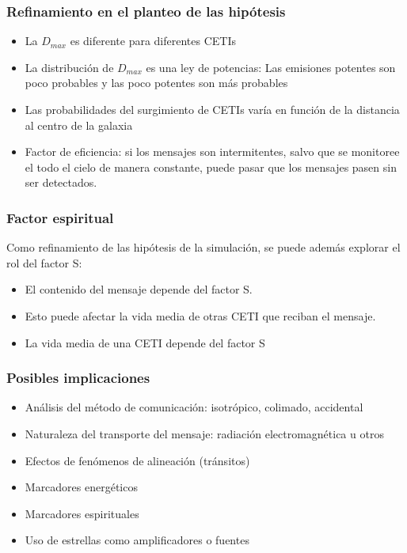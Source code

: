 \documentclass[handout]{beamer}
\theoremstyle{plain}
\theoremstyle{definition}
\theoremstyle{remark}
\begin{document}
                    
\begin{frame}\frametitle{Refinamiento en el planteo de las hipótesis}

   \begin{itemize}
      \item La $D_{max}$ es diferente para diferentes CETIs
      \item La distribución de $D_{max}$ es una ley de potencias: Las
         emisiones potentes son poco probables y las poco potentes son
         más probables
      \item Las probabilidades del surgimiento de CETIs varía en
         función de la distancia al centro de la galaxia
      \item Factor de eficiencia: si los mensajes son intermitentes,
         salvo que se monitoree el todo el cielo de manera constante,
         puede pasar que los mensajes pasen sin ser detectados.
   \end{itemize}

\end{frame}
                        
                     
\begin{frame}\frametitle{Factor espiritual}

   Como refinamiento de las hipótesis de la simulación, se puede
   además explorar el rol del factor S:

   \begin{itemize}
      \item El contenido del mensaje depende del factor S.          
      \item Esto puede afectar la vida media de otras CETI que reciban el mensaje.
      \item La vida media de una CETI depende del factor S
   \end{itemize}

\end{frame}
 
                     
                     
\begin{frame}\frametitle{Posibles implicaciones}

   \begin{itemize}
      \item Análisis del método de comunicación: isotrópico, colimado,
         accidental
      \item Naturaleza del transporte del mensaje: radiación
         electromagnética u otros
      \item Efectos de fenómenos de alineación (tránsitos)
      \item Marcadores energéticos
      \item Marcadores espirituales
      \item Uso de estrellas como amplificadores o fuentes
   \end{itemize}

\end{frame}
 
\end{document}
